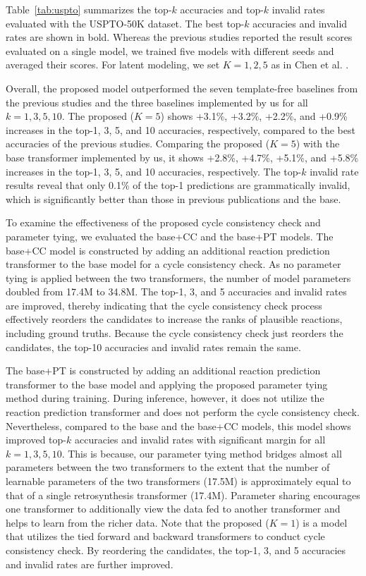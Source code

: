 \documentclass[journal=jacsat,manuscript=article]{achemso}
\begin{document}
	Table~\ref{tab:uspto} summarizes the top-$k$ accuracies and top-$k$ invalid rates evaluated with the USPTO-50K dataset. The best top-$k$ accuracies and invalid rates are shown in bold. Whereas the previous studies \cite{liu2017retrosynthetic,karpov2019transformer,chen2019learning,lin2020automatic,zheng2019predicting} reported the result scores evaluated on a single model, we trained five models with different seeds and averaged their scores. For latent modeling, we set $K=1, 2, 5$ as in Chen et al. \cite{chen2019learning}. 
	
	Overall, the proposed model outperformed the seven template-free baselines from the previous studies and the three baselines implemented by us for all $k=1,3,5,10$. The proposed ($K=5$) shows +3.1\%, +3.2\%, +2.2\%, and +0.9\% increases in the top-1, 3, 5, and 10 accuracies, respectively, compared to the best accuracies of the previous studies. Comparing the proposed ($K=5$) with the base transformer implemented by us, it shows +2.8\%, +4.7\%, +5.1\%, and +5.8\% increases in the top-1, 3, 5, and 10 accuracies, respectively. The top-$k$ invalid rate results reveal that only 0.1\% of the top-1 predictions are grammatically invalid, which is significantly better than those in previous publications and the base.
	
	To examine the effectiveness of the proposed cycle consistency check and parameter tying, we evaluated the base+CC and the base+PT models. The base+CC model is constructed by adding an additional reaction prediction transformer to the base model for a cycle consistency check. As no parameter tying is applied between the two transformers, the number of model parameters doubled from 17.4M to 34.8M. The top-1, 3, and 5 accuracies and invalid rates are improved, thereby indicating that the cycle consistency check process effectively reorders the candidates to increase the ranks of plausible reactions, including ground truths. Because the cycle consistency check just reorders the candidates, the top-10 accuracies and invalid rates remain the same. 
	
	The base+PT is constructed by adding an additional reaction prediction transformer to the base model and applying the proposed parameter tying method during training. During inference, however, it does not utilize the reaction prediction transformer and does not perform the cycle consistency check. Nevertheless, compared to the base and the base+CC models, this model shows improved top-$k$ accuracies and invalid rates with significant margin for all $k=1,3,5,10$. This is because, our parameter tying method bridges almost all parameters between the two transformers to the extent that the number of learnable parameters of the two transformers (17.5M) is approximately equal to that of a single retrosynthesis transformer (17.4M). Parameter sharing encourages one transformer to additionally view the data fed to another transformer and helps to learn from the richer data. Note that the proposed ($K=1$) is a model that utilizes the tied forward and backward transformers to conduct cycle consistency check. By reordering the candidates, the top-1, 3, and 5 accuracies and invalid rates are further improved.
	
\end{document}
